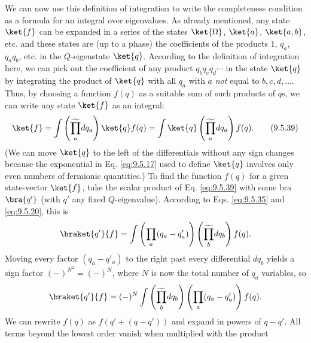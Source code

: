We can now use this definition of integration to write the completeness
condition as a formula for an integral over eigenvalues. As already mentioned,
any state $\ket{f}$ can be expanded in a series of the states $\ket{\Omega}$,
$\ket{a}$, $\ket{a,b}$, etc. and these states are (up to a phase) the
coefficients of the products $1$, $q_a$, $q_aq_b$, etc. in the $Q$-eigenstate
$\ket{q}$. According to the definition of integration here, we can pick out
the coefficient of any product $q_bq_cq_d\cdots$ in the state $\ket{q}$ by
integrating the product of $\ket{q}$ with all $q_a$ with $a$ \emph{not} equal
to $b,c,d,\ldots$. Thus, by choosing a function $f(q)$ as a suitable sum of
such products of $q$s, we can write any state $\ket{f}$ as an integral:
\begin{equation}
\ket{f}=\int\left(\widetilde{\prod_a}dq_a\right)\ket{q}f(q)
=\int\ket{q}\left(\widetilde{\prod_a}dq_a\right)f(q).
\tag{9.5.39}\label{eq:9.5.39}
\end{equation}
(We can move $\ket{q}$ to the left of the differentials without any sign
changes because the exponential in Eq. \eqref{eq:9.5.17} used to define $\ket{q}$
involves only even numbers of fermionic quantities.) To find the function
$f(q)$ for a given state-vector $\ket{f}$, take the scalar product of Eq.
\eqref{eq:9.5.39} with some bra $\bra{q'}$ (with $q'$ any fixed $Q$-eigenvalue).
According to Eqs. \eqref{eq:9.5.35} and \eqref{eq:9.5.20}, this is
\[
\braket{q'}{f}=\int\left(\prod_a(q_a-q'_a)\right)
 \left(\widetilde{\prod_b}dq_b\right)f(q).
\]
Moving every factor $(q_a-q'_a)$ to the right past every differential $dq_b$
yields a sign factor $(-)^{N^2}=(-)^N$, where $N$ is now the total number of
$q_a$ variables, so
\[
\braket{q'}{f}=(-)^N\int\left(\widetilde{\prod_b}dq_b\right)
 \left(\prod_a(q_a-q'_a)\right)f(q).
\]
We can rewrite $f(q)$ as $f(q'+(q-q'))$ and expand in powers of $q-q'$. All
terms beyond the lowest order vanish when multiplied with the product
